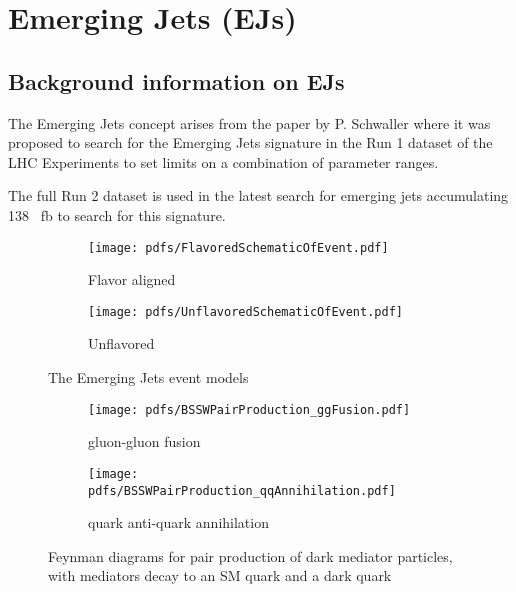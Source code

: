 \chapter{Emerging Jets (EJs) \label{ch:emj}}


\section{Background information on EJs}

The Emerging Jets concept arises from the paper by P. Schwaller \cite{Schwaller:2015gea} where it was proposed to search for the Emerging Jets signature in the Run 1 dataset of the LHC Experiments to set limits on a combination of parameter ranges.



The full Run 2 dataset is used in the latest search for emerging jets \cite{CMS:2024gxp} accumulating 138 \unit{\per\femto\barn} to search for this signature.



\begin{figure}
\centering
        \begin{subfigure}{.45\linewidth}
            \texttt{[image: pdfs/FlavoredSchematicOfEvent.pdf]}
            \caption{Flavor aligned}
        \end{subfigure}
    \begin{subfigure}{.45\linewidth}
        \texttt{[image: pdfs/UnflavoredSchematicOfEvent.pdf]}
        \caption{Unflavored}
    \end{subfigure}
    \caption{The Emerging Jets event models}
    \label{fig:emj_production}
\end{figure}

\begin{figure}
    \begin{center}
        \begin{subfigure}{.45\linewidth}
            \texttt{[image: pdfs/BSSWPairProduction\_ggFusion.pdf]}
            \caption{gluon-gluon fusion}
        \end{subfigure}
        \begin{subfigure}{.45\linewidth}
            \texttt{[image: pdfs/BSSWPairProduction\_qqAnnihilation.pdf]}
            \caption{quark anti-quark annihilation}
        \end{subfigure}
    \end{center}
    \caption[Emergin jets production modes]{Feynman diagrams for pair production of dark mediator particles, with mediators decay to an SM quark and a dark quark}
\end{figure}

